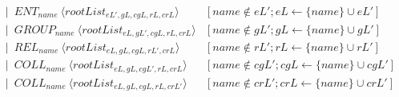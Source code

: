 \begin{landscape}
\begin{adjustbox}{max width=\linewidth,max height=.95\textheight,valign=c}
{\begin{align}
                                                            & ~~ \mid ~ ENT_{name}  ~ \langle rootList_{eL',gL,cgL,rL,crL} \rangle                                                                                                                                                                                                                                                                                                                         & [name \notin eL'; eL \gets \{name\} \cup eL']                                                                     \label{meta:rootList:2} \\
                                                            & ~~ \mid ~ GROUP_{name} ~ \langle rootList_{eL,gL',cgL,rL,crL} \rangle                                                                                                                                                                                                                                                                                                                        & [name \notin gL'; gL \gets \{name\} \cup gL']                                                                     \label{meta:rootList:3} \\
                                                            & ~~ \mid ~ REL_{name}  ~ \langle rootList_{eL,gL,cgL,rL',crL} \rangle                                                                                                                                                                                                                                                                                                                         & [name \notin rL'; rL \gets \{name\} \cup rL']                                                                     \label{meta:rootList:4} \\
                                                            & ~~ \mid ~ COLL_{name} ~ \langle rootList_{eL,gL,cgL',rL,crL} \rangle                                                                                                                                                                                                                                                                                                                         & [name \notin cgL'; cgL \gets \{name\} \cup cgL']                                                                  \label{meta:rootList:5} \\
                                                            & ~~ \mid ~ COLL_{name} ~ \langle rootList_{eL,gL,cgL,rL,crL'} \rangle                                                                                                                                                                                                                                                                                                                         & [name \notin crL'; crL \gets \{name\} \cup crL']                                                                  \label{meta:rootList:6} \\[1em]

\end{align}}
\end{adjustbox}
\end{landscape}
